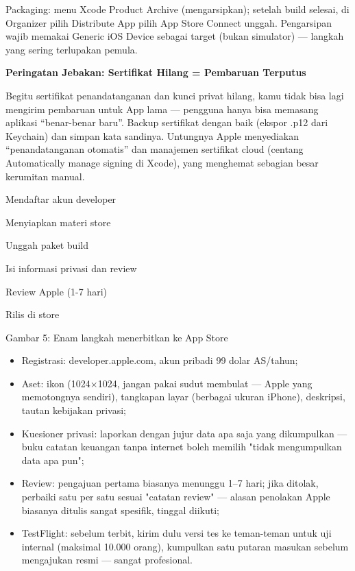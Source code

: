 Packaging: menu Xcode Product Archive (mengarsipkan); setelah build selesai, di Organizer pilih Distribute App pilih App Store Connect unggah. Pengarsipan wajib memakai Generic iOS Device sebagai target (bukan simulator) — langkah yang sering terlupakan pemula.

\textbf{Peringatan Jebakan: Sertifikat Hilang = Pembaruan Terputus}\par

Begitu sertifikat penandatanganan dan kunci privat hilang, kamu tidak bisa lagi mengirim pembaruan untuk App lama — pengguna hanya bisa memasang aplikasi “benar-benar baru”. Backup sertifikat dengan baik (ekspor .p12 dari Keychain) dan simpan kata sandinya. Untungnya Apple menyediakan “penandatanganan otomatis” dan manajemen sertifikat cloud (centang Automatically manage signing di Xcode), yang menghemat sebagian besar kerumitan manual.


Mendaftar akun developer

Menyiapkan materi store

Unggah paket build

Isi informasi privasi dan review

Review Apple (1-7 hari)

Rilis di store

\begin{center}\small\color{gray}Gambar 5: Enam langkah menerbitkan ke App Store\end{center}

\begin{itemize}
  \item Registrasi: developer.apple.com, akun pribadi 99 dolar AS/tahun;
  \item Aset: ikon (1024×1024, jangan pakai sudut membulat — Apple yang memotongnya sendiri), tangkapan layar (berbagai ukuran iPhone), deskripsi, tautan kebijakan privasi;
  \item Kuesioner privasi: laporkan dengan jujur data apa saja yang dikumpulkan — buku catatan keuangan tanpa internet boleh memilih "tidak mengumpulkan data apa pun";
  \item Review: pengajuan pertama biasanya menunggu 1–7 hari; jika ditolak, perbaiki satu per satu sesuai "catatan review" — alasan penolakan Apple biasanya ditulis sangat spesifik, tinggal diikuti;
  \item TestFlight: sebelum terbit, kirim dulu versi tes ke teman-teman untuk uji internal (maksimal 10.000 orang), kumpulkan satu putaran masukan sebelum mengajukan resmi — sangat profesional.
\end{itemize}


